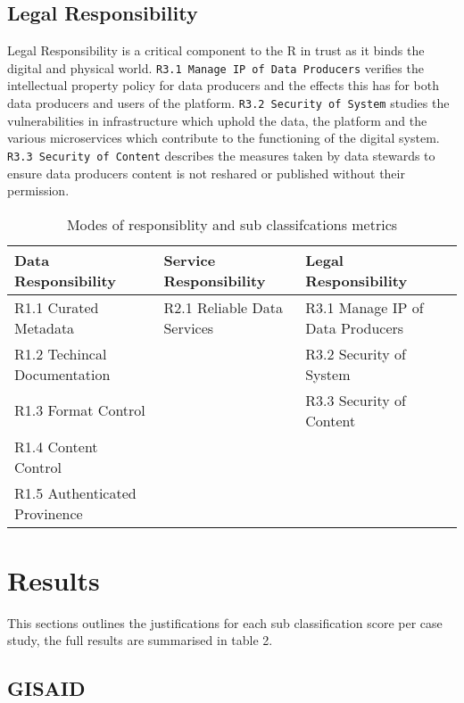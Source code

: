 \documentclass{article}
\begin{document}
\hypertarget{legal-responsibility}{%
\subsection{Legal Responsibility}\label{legal-responsibility}}

Legal Responsibility is a critical component to the R in trust as it
binds the digital and physical world.
\texttt{R3.1\ Manage\ IP\ of\ Data\ Producers} verifies the intellectual
property policy for data producers and the effects this has for both
data producers and users of the platform.
\texttt{R3.2\ Security\ of\ System} studies the vulnerabilities in
infrastructure which uphold the data, the platform and the various
microservices which contribute to the functioning of the digital system.
\texttt{R3.3\ Security\ of\ Content} describes the measures taken by
data stewards to ensure data producers content is not reshared or
published without their permission.

\begin{table}[H]

\caption{\label{tab:fig1}Modes of responsiblity and sub classifcations metrics}
\centering
\begin{tabular}[t]{l|l|l}
\hline
Data Responsibility & Service Responsibility & Legal Responsibility\\
\hline
R1.1 Curated Metadata & R2.1 Reliable Data Services & R3.1 Manage IP of Data Producers\\
\hline
R1.2 Techincal Documentation &  & R3.2 Security of System\\
\hline
R1.3 Format Control &  & R3.3 Security of Content\\
\hline
R1.4 Content Control &  & \\
\hline
R1.5 Authenticated Provinence &  & \\
\hline
\end{tabular}
\end{table}

\hypertarget{results}{%
\section{Results}\label{results}}

This sections outlines the justifications for each sub classification
score per case study, the full results are summarised in table 2.

\hypertarget{gisaid}{%
\subsection{GISAID}\label{gisaid}}
\end{document}
